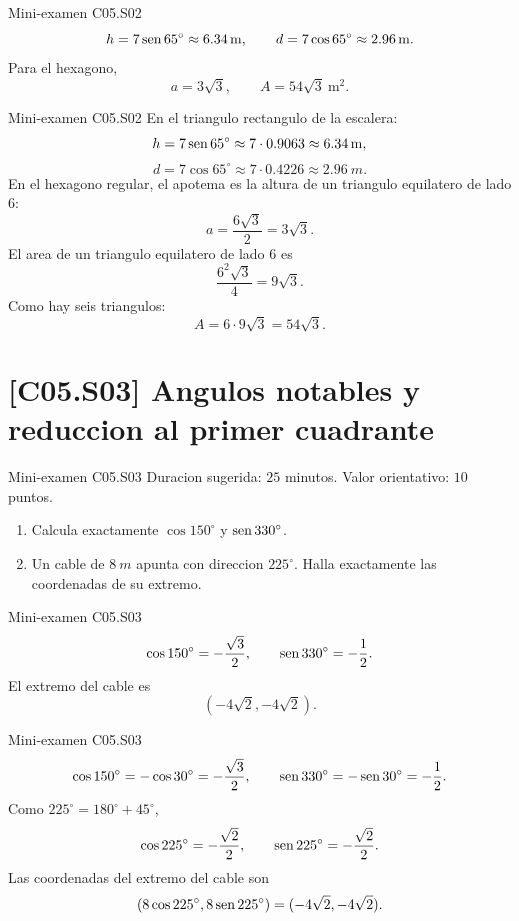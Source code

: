 \begin{shortanswer}{Mini-examen C05.S02}
\[
h=7\operatorname{sen} 65^\circ\approx \SI{6.34}{m},
\qquad
d=7\cos 65^\circ\approx \SI{2.96}{m}.
\]
Para el hexagono,
\[
a=3\sqrt3,
\qquad
A=54\sqrt3\ \text{m}^2.
\]
\end{shortanswer}

\begin{fullsolution}{Mini-examen C05.S02}
En el triangulo rectangulo de la escalera:
\[
h=7\operatorname{sen} 65^\circ\approx 7\cdot 0.9063\approx \SI{6.34}{m},
\]
\[
d=7\cos 65^\circ\approx 7\cdot 0.4226\approx \SI{2.96}{m}.
\]
En el hexagono regular, el apotema es la altura de un triangulo equilatero de lado \(6\):
\[
a=\frac{6\sqrt3}{2}=3\sqrt3.
\]
El area de un triangulo equilatero de lado \(6\) es
\[
\frac{6^2\sqrt3}{4}=9\sqrt3.
\]
Como hay seis triangulos:
\[
A=6\cdot 9\sqrt3=54\sqrt3.
\]
\end{fullsolution}

\section{[C05.S03] Angulos notables y reduccion al primer cuadrante}

\begin{exambrief}{Mini-examen C05.S03}
Duracion sugerida: \(25\) minutos. Valor orientativo: \(10\) puntos.
\begin{enumerate}
  \item Calcula exactamente \(\cos 150^\circ\) y \(\operatorname{sen} 330^\circ\).
  \item Un cable de \(\SI{8}{m}\) apunta con direccion \(225^\circ\). Halla exactamente las
  coordenadas de su extremo.
\end{enumerate}
\end{exambrief}

\begin{shortanswer}{Mini-examen C05.S03}
\[
\cos 150^\circ=-\frac{\sqrt3}{2},
\qquad
\operatorname{sen} 330^\circ=-\frac12.
\]
El extremo del cable es
\[
(-4\sqrt2,-4\sqrt2).
\]
\end{shortanswer}

\begin{fullsolution}{Mini-examen C05.S03}
\[
\cos 150^\circ=-\cos 30^\circ=-\frac{\sqrt3}{2},
\qquad
\operatorname{sen} 330^\circ=-\operatorname{sen} 30^\circ=-\frac12.
\]
Como \(225^\circ=180^\circ+45^\circ\),
\[
\cos 225^\circ=-\frac{\sqrt2}{2},
\qquad
\operatorname{sen} 225^\circ=-\frac{\sqrt2}{2}.
\]
Las coordenadas del extremo del cable son
\[
(8\cos225^\circ,8\operatorname{sen}225^\circ)=(-4\sqrt2,-4\sqrt2).
\]
\end{fullsolution}

